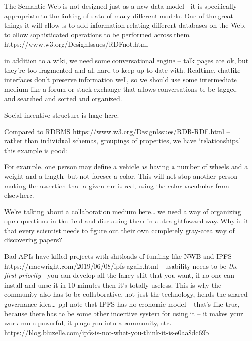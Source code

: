 \documentclass[11pt]{article}
\begin{document}
\begin{multicols}{2}
\begin{leftbar}
The Semantic Web is not designed just as a new data model - it is
specifically appropriate to the linking of data of many different
models. One of the great things it will allow is to add information
relating different databases on the Web, to allow sophisticated
operations to be performed across them.
https://www.w3.org/DesignIssues/RDFnot.html
\end{leftbar}

in addition to a wiki, we need some conversational engine -- talk pages
are ok, but they're too fragmented and all hard to keep up to date with.
Realtime, chatlike interfaces don't preserve information well, so we
should use some intermediate medium like a forum or stack exchange that
allows conversations to be tagged and searched and sorted and organized.

Social incentive structure is huge here.

Compared to RDBMS https://www.w3.org/DesignIssues/RDB-RDF.html -- rather
than individual schemas, groupings of properties, we have
`relationships.' this example is good:

\begin{leftbar}
For example, one person may define a vehicle as having a number of
wheels and a weight and a length, but not foresee a color. This will not
stop another person making the assertion that a given car is red, using
the color vocabular from elsewhere.
\end{leftbar}

We're talking about a collaboration medium here\ldots{} we need a way of
organizing open questions in the field and discussing them in a
straightfoward way. Why is it that every scientist needs to figure out
their own completely gray-area way of discovering papers?

Bad APIs have killed projects with shitloads of funding like NWB and
IPFS https://macwright.com/2019/06/08/ipfs-again.html - usability needs
to be \emph{the first priority} - you can develop all the fancy shit
that you want, if no one can install and unse it in 10 minutes then it's
totally useless. This is why the community also has to be collaborative,
not just the technology, hends the shared governance idea\ldots{} ppl
note that IPFS has no economic model -- that's like true, because there
has to be some other incentive system for using it -- it makes your work
more powerful, it plugs you into a community, etc.
https://blog.bluzelle.com/ipfs-is-not-what-you-think-it-is-e0aa8dc69b

\hypertarget{credit-assignment}{%
}
\end{multicols}
\end{document}
